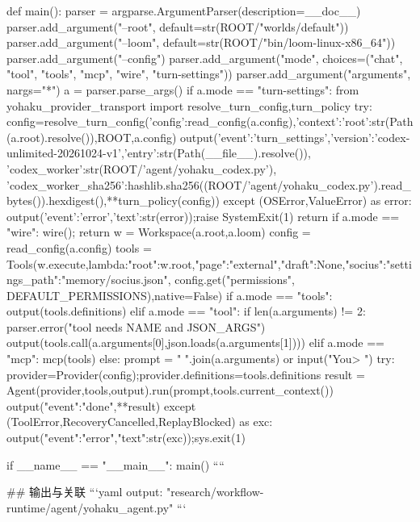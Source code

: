 def main():
    parser = argparse.ArgumentParser(description=__doc__)
    parser.add_argument("--root", default=str(ROOT/"worlds/default"))
    parser.add_argument("--loom", default=str(ROOT/"bin/loom-linux-x86_64"))
    parser.add_argument("--config")
    parser.add_argument("mode", choices=("chat", "tool", "tools", "mcp", "wire", "turn-settings"))
    parser.add_argument("arguments", nargs="*")
    a = parser.parse_args()
    if a.mode == "turn-settings":
        from yohaku_provider_transport import resolve_turn_config,turn_policy
        try:
            config=resolve_turn_config({'config':read_config(a.config),'context':{'root':str(Path(a.root).resolve())}},ROOT,a.config)
            output({'event':'turn_settings','version':'codex-unlimited-20261024-v1','entry':str(Path(__file__).resolve()),
                    'codex_worker':str(ROOT/'agent/yohaku_codex.py'),
                    'codex_worker_sha256':hashlib.sha256((ROOT/'agent/yohaku_codex.py').read_bytes()).hexdigest(),**turn_policy(config)})
        except (OSError,ValueError) as error:
            output({'event':'error','text':str(error)});raise SystemExit(1)
        return
    if a.mode == "wire": wire(); return
    w = Workspace(a.root,a.loom)
    config = read_config(a.config)
    tools = Tools(w.execute,lambda:{"root":w.root,"page":"external","draft":None,"socius":{"settings_path":"memory/socius.json"}}, config.get("permissions", DEFAULT_PERMISSIONS),native=False)
    if a.mode == "tools": output(tools.definitions)
    elif a.mode == "tool":
        if len(a.arguments) != 2: parser.error("tool needs NAME and JSON_ARGS")
        output(tools.call(a.arguments[0],json.loads(a.arguments[1])))
    elif a.mode == "mcp": mcp(tools)
    else:
        prompt = " ".join(a.arguments) or input("You> ")
        try:
            provider=Provider(config);provider.definitions=tools.definitions
            result = Agent(provider,tools,output).run(prompt,tools.current_context())
            output({"event":"done",**result})
        except (ToolError,RecoveryCancelled,ReplayBlocked) as exc: output({"event":"error","text":str(exc)});sys.exit(1)

if __name__ == "__main__": main()
````

## 输出与关联
```yaml
output: "research/workflow-runtime/agent/yohaku_agent.py"
```
